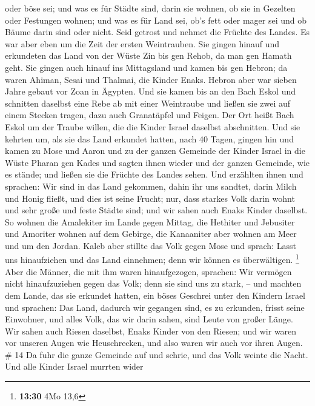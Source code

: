 oder böse sei; und was es für Städte sind, darin sie wohnen, ob sie in
Gezelten oder Festungen wohnen;  und was es für Land sei,
ob's fett oder mager sei und ob Bäume darin sind oder nicht. Seid
getrost und nehmet die Früchte des Landes. Es war aber eben um die Zeit
der ersten Weintrauben.  Sie gingen hinauf und erkundeten
das Land von der Wüste Zin bis gen Rehob, da man gen Hamath geht.
 Sie gingen auch hinauf ins Mittagsland und kamen bis gen
Hebron; da waren Ahiman, Sesai und Thalmai, die Kinder Enaks. Hebron
aber war sieben Jahre gebaut vor Zoan in Ägypten.  Und
sie kamen bis an den Bach Eskol und schnitten daselbst eine Rebe ab mit
einer Weintraube und ließen sie zwei auf einem Stecken tragen, dazu auch
Granatäpfel und Feigen.  Der Ort heißt Bach Eskol um der
Traube willen, die die Kinder Israel daselbst abschnitten.
 Und sie kehrten um, als sie das Land erkundet hatten,
nach 40 Tagen,  gingen hin und kamen zu Mose und Aaron
und zu der ganzen Gemeinde der Kinder Israel in die Wüste Pharan gen
Kades und sagten ihnen wieder und der ganzen Gemeinde, wie es stände;
und ließen sie die Früchte des Landes sehen.  Und
erzählten ihnen und sprachen: Wir sind in das Land gekommen, dahin ihr
uns sandtet, darin Milch und Honig fließt, und dies ist seine Frucht;
 nur, dass starkes Volk darin wohnt und sehr große und
feste Städte sind; und wir sahen auch Enaks Kinder daselbst.
 So wohnen die Amalekiter im Lande gegen Mittag, die
Hethiter und Jebusiter und Amoriter wohnen auf dem Gebirge, die
Kanaaniter aber wohnen am Meer und um den Jordan.  Kaleb
aber stillte das Volk gegen Mose und sprach: Lasst uns hinaufziehen und
das Land einnehmen; denn wir können es überwältigen. \footnote{\textbf{13:30}
  4Mo 13,6}  Aber die Männer, die mit ihm waren
hinaufgezogen, sprachen: Wir vermögen nicht hinaufzuziehen gegen das
Volk; denn sie sind uns zu stark, --  und machten dem
Lande, das sie erkundet hatten, ein böses Geschrei unter den Kindern
Israel und sprachen: Das Land, dadurch wir gegangen sind, es zu
erkunden, frisst seine Einwohner, und alles Volk, das wir darin sahen,
sind Leute von großer Länge.  Wir sahen auch Riesen
daselbst, Enaks Kinder von den Riesen; und wir waren vor unseren Augen
wie Heuschrecken, und also waren wir auch vor ihren Augen. \# 14
 Da fuhr die ganze Gemeinde auf und schrie, und das Volk
weinte die Nacht.  Und alle Kinder Israel murrten wider

